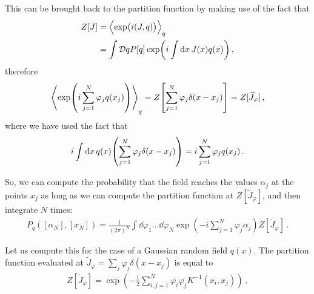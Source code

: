 \documentclass[main.tex]{subfiles}
\begin{document}
This can be brought back to the partition function by making use of the fact that 
%
\begin{align}
Z[J] &= \expval{\exp(i (J, q))}_q  \\
&= \int \mathcal{D}q P[q] \exp( i \int \dd{x} J(x) q(x))
\,,
\end{align}
%
therefore 
%
\begin{align}
\expval{\exp(i \sum _{j=1}^{N}\varphi _j q(x_j))}_q
= Z \qty[ \sum _{j=1}^{N} \varphi _j \delta (x - x_j)] 
= Z[ \widetilde{J}_\varphi ]
\,,
\end{align}
%
where we have used the fact that 
%
\begin{align}
i \int \dd{x} q(x) \qty(\sum _{j=1}^{N} \varphi _j \delta (x-x_j))
= i \sum _{j=1}^{N} \varphi_j q(x_j) 
\,.
\end{align}

So, we can compute the probability that the field reaches the values \(\alpha _j\) at the points \(x_j\) as long as we can compute the partition function at \(Z[\widetilde{J}_\varphi ]\), and then integrate \(N\) times: 
%
\begin{align}
P_q ([\alpha _N], [x_N]) = \frac{1}{(2 \pi)^{N}} 
\int \dd{\varphi_1 } \dots \dd{\varphi _N }
\exp(-i \sum _{j=1}^{N} \varphi _j \alpha_j )
Z[\widetilde{J}_\varphi ]
\,.
\end{align}

Let us compute this for the case of a Gaussian random field \(q(x)\). The partition function evaluated at \(\widetilde{J}_\varphi = \sum _{j} \varphi _j \delta (x- x_j)\) is equal to 
%
\begin{align}
Z[\widetilde{J}_\varphi ] = \exp( - \frac{1}{2} \sum _{i, j =1}^{N} \varphi _i \varphi _j K^{-1} (x_i, x_j))
\,,
\end{align}
%
\end{document}
